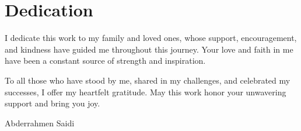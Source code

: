 \chapter*{Dedication} %
\thispagestyle{empty}

I dedicate this work to my family and loved ones, whose support, encouragement, and kindness 
have guided me throughout this journey. Your love and faith in me have been a constant source 
of strength and inspiration.

To all those who have stood by me, shared in my challenges, and celebrated my successes, 
I offer my heartfelt gratitude. May this work honor your unwavering support and bring you joy.

\vspace{1cm} %
\hfill Abderrahmen Saidi